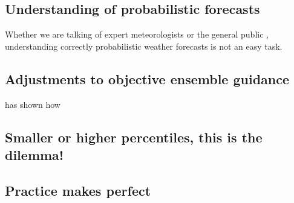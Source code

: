 \subsection{Understanding of probabilistic forecasts}
Whether we are talking of expert meteorologists \citep{Stewart2016} or the general public \citep{Gigerenzer2005}, understanding correctly probabilistic weather forecasts is not an easy task.

\subsection{Adjustments to objective ensemble guidance}
\citet{Novak2008} has shown how 

\subsection{Smaller or higher percentiles, this is the dilemma!}
\subsection{Practice makes perfect}